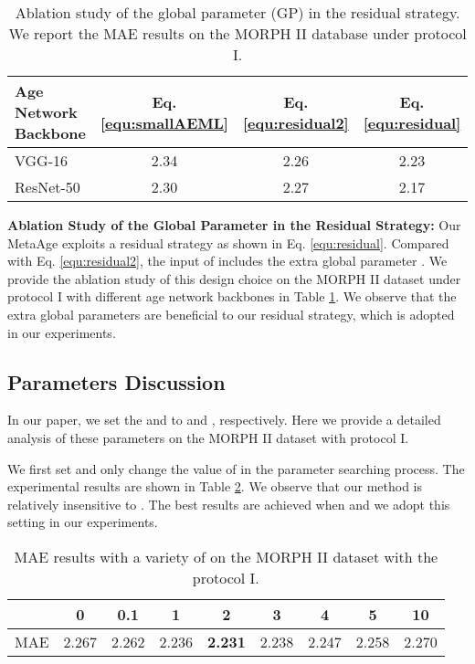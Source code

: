 \documentclass[journal,twoside]{IEEEtran}
\begin{document}
\begin{table}[t]
\caption{Ablation study of the global parameter (GP) in the residual strategy. We report the MAE results on the MORPH II database under protocol I.}
\renewcommand\tabcolsep{10pt}
\centering
\begin{tabular}{lccc}
\toprule
Age Network Backbone  &  Eq. \eqref{equ:smallAEML}  & Eq. \eqref{equ:residual2} & Eq. \eqref{equ:residual}  \\
\midrule
VGG-16 & 2.34 &  2.26 & 2.23   \\
ResNet-50  & 2.30 & 2.27 & 2.17 \\
\bottomrule
\end{tabular}
\label{table:gp}
\end{table}



\textbf{Ablation Study of the Global Parameter in the Residual Strategy:}
Our MetaAge exploits a residual strategy as shown in Eq. \eqref{equ:residual}. Compared with Eq. \eqref{equ:residual2}, the input of  includes the extra global parameter .  We provide the ablation study of this design choice on the MORPH II dataset under protocol I with different age network backbones in Table \ref{table:gp}.  We observe that the extra global parameters  are beneficial to our residual strategy, which is adopted in our experiments.










\subsection{Parameters Discussion}

In our paper, we set the  and  to  and , respectively. Here we provide a detailed analysis of these parameters on the MORPH II dataset with protocol I.

We first set  and only change the value of  in the parameter searching process. The experimental results are shown in Table \ref{table:delta}. We observe that our method is relatively insensitive to . The best results are achieved when  and we adopt this setting in our experiments.

\begin{table}[t]
  \caption{MAE results with a variety of  on the MORPH II dataset with the protocol I.}
  \label{table:delta}
  \renewcommand\tabcolsep{5pt}
  \centering
  \begin{tabular}{l|cccccccc}
  \toprule
   & 0 & 0.1 & 1 & 2 & 3 & 4 & 5  & 10   \\
  \midrule
  MAE & 2.267 & 2.262 & 2.236 & \textbf{2.231} & 2.238 & 2.247 & 2.258 & 2.270 \\
  \bottomrule
  \end{tabular}
\end{table}
\end{document}
